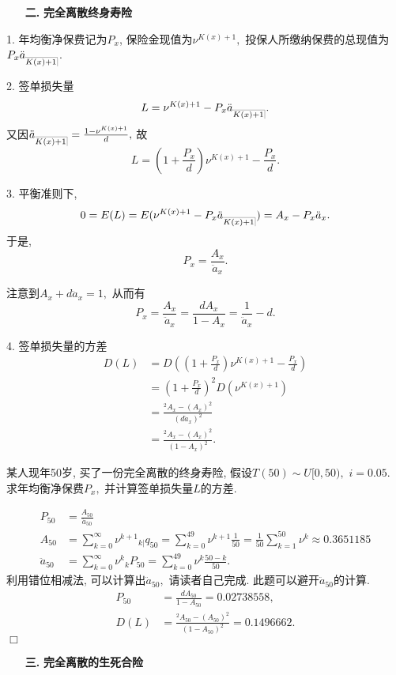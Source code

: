 \documentclass[a4paper,openany, 10pt]{ctexbook}
\makeatletter
\newcommand{\hei}{\CJKfamily{hei}}      %
\def\qed{\hfill$\Box$\medskip}
\def\z{\left}
\def\y{\right}
\DeclareRobustCommand{\annu}[1]{_{%
    \def\arraystretch{0}%
    \setlength\arraycolsep{1pt}%
    \setlength\arrayrulewidth{.2pt}%
    \begin{array}[b]{@{}c|}\hline
        \\[\arraycolsep]%
        \scriptstyle #1%
    \end{array}%
}}
\makeatother
\begin{document}
\begin{itemize}
    \item[{\bf\hei 二.}]{\bf\hei 完全离散终身寿险}
\end{itemize}

1. 年均衡净保费记为$P_{x}$, 保险金现值为$\nu^{K(x)+1},$
投保人所缴纳保费的总现值为$P_{x}\ddot{a}_{\annu{K(x)+1}}$.

2. 签单损失量
$$L=\nu^{K(x)+1}-P_{x}\ddot{a}_{\annu{K(x)+1}}.$$
又因$\ddot{a}_{\annu{K(x)+1}}=\frac{1-\nu^{K(x)+1}}{d},$ 故
$$L = \z(1+\frac{P_{x}}{d}\y)\nu^{K(x)+1}-\frac{P_{x}}{d}.$$

3. 平衡准则下, $$0=E(L)=E(\nu^{K(x)+1}-P_{x}\ddot{a}_{\annu{K(x)+1}})=A_{x}-P_{x}\ddot{a}_{x}. $$
于是,
$$P_{x}=\frac{A_{x}}{\ddot{a}_{x}}.$$

注意到$A_{x}+d\ddot{a}_{x}=1,$ 从而有$$P_{x}=\frac{A_{x}}{\ddot{a}_{x}}=\frac{dA_{x}}{1-A_{x}}=\frac{1}{\ddot{a}_{x}}-d.$$

4. 签单损失量的方差
\begin{align*}
D(L) &= D\z((1+\frac{P_{x}}{d})\nu^{K(x)+1}-\frac{P_{x}}{d}\y)\\
&= \z(1+\frac{P_{x}}{d}\y)^{2}D(\nu^{K(x)+1})\\
&= \frac{{}^{2}A_{x}-(A_{x})^{2}}{(d\ddot{a}_{x})^{2}}\\
&= \frac{{}^{2}A_{x}-(A_{x})^{2}}{(1-A_{x})^{2}}.
\end{align*}
\begin{example}
   某人现年50岁, 买了一份完全离散的终身寿险, 假设$T(50)\sim U[0,50),$ $i=0.05.$ 求年均衡净保费$P_{x},$ 并计算签单损失量$L$的方差.
\end{example}
\solution
\begin{align*}
P_{50}&=\frac{A_{50}}{\ddot{a}_{50}}\\
A_{50}&=\sum^{\infty}_{k=0}\nu^{k+1}{}_{k|}q_{50}=\sum^{49}_{k=0}\nu^{k+1}\frac{1}{50}=\frac{1}{50}\sum^{50}_{k=1}\nu^{k}
\approx 0.3651185\\
\ddot{a}_{50}&=\sum^{\infty}_{k=0}\nu^{k}{}_{k}P_{50}=\sum^{49}_{k=0}\nu^{k}\frac{50-k}{50}.
\end{align*}
利用错位相减法, 可以计算出$\ddot{a}_{50},$  请读者自己完成. 此题可以避开$\ddot{a}_{50}$的计算.
\begin{align*}
P_{50}&=\frac{dA_{50}}{1-A_{50}}=0.02738558,\\
D(L)&=\frac{^{2}A_{50}-(A_{50})^{2}}{(1-A_{50})^2}= 0.1496662.
\end{align*}
\qed
\begin{itemize}
    \item[{\bf\hei 三.}]{\bf\hei 完全离散的生死合险}
\end{itemize}
\end{document}
